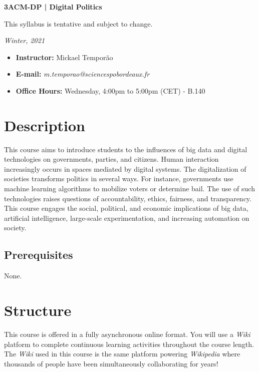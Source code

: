 \documentclass{article}
\begin{document}
\begin{center}
    {\Large\textbf{3ACM-DP | Digital Politics}}

This syllabus is tentative and subject to change.

\textit{Winter, 2021}
\end{center}

\begin{itemize}
    \item \textbf{Instructor:} Mickael Temporão
    \item \textbf{E-mail:} \textit{m.temporao@sciencespobordeaux.fr}
    \item \textbf{Office Hours:} Wednesday, 4:00pm to 5:00pm (CET) - B.140
\end{itemize}


\section*{Description}

This course aims to introduce students to the influences of big data and digital technologies on governments, parties, and citizens. Human interaction increasingly occurs in spaces mediated by digital systems. The digitalization of societies transforms politics in several ways. For instance, governments use machine learning algorithms to mobilize voters or determine bail. The use of such technologies raises questions of accountability, ethics, fairness, and transparency. This course engages the social, political, and economic implications of big data, artificial intelligence, large-scale experimentation, and increasing automation on society.

\subsection*{Prerequisites}
None.


\section*{Structure}

This course is offered in a fully asynchronous online format. You will use a \textit{Wiki} platform to complete continuous learning activities throughout the course length. The \textit{Wiki} used in this course is the same platform powering \textit{Wikipedia} where thousands of people have been simultaneously collaborating for years!
\end{document}
